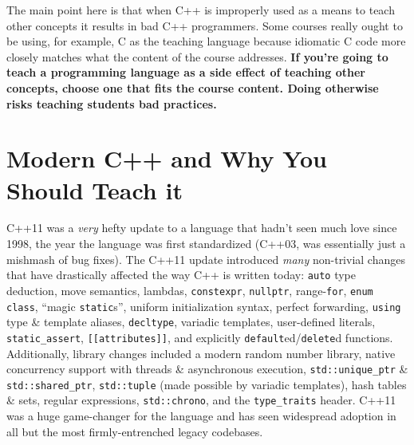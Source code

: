 \documentclass{article}
\begin{document}
 The main point here is that when C++ is improperly used as a means to teach other concepts it results in bad C++ programmers.  Some courses really ought to be using, for example, C as the teaching language because idiomatic C code more closely matches what the content of the course addresses.  \textbf{If you're going to teach a programming language as a side effect of teaching other concepts, choose one that fits the course content.  Doing otherwise risks teaching students bad practices.}

\section*{Modern C++ and Why You Should Teach it}
C++11 was a \emph{very} hefty update to a language that hadn't seen much love since 1998, the year the language was first standardized (C++03, was essentially just a mishmash of bug fixes).  The C++11 update introduced \emph{many} non-trivial changes that have drastically affected the way C++ is written today:  \texttt{auto} type deduction, move semantics, lambdas, \lstinline{constexpr}, \lstinline{nullptr}, range-\lstinline{for}, \lstinline{enum class}, ``magic \lstinline{static}s'', uniform initialization syntax, perfect forwarding, \lstinline{using} type \& template aliases, \lstinline{decltype}, variadic templates, user-defined literals, \lstinline{static_assert}, \lstinline{[[attributes]]}, and explicitly \lstinline{default}ed/\lstinline{delete}d functions.  Additionally, library changes included a modern random number library, native concurrency support with threads \& asynchronous execution, \lstinline{std::unique_ptr} \& \lstinline{std::shared_ptr}, \lstinline{std::tuple} (made possible by variadic templates), hash tables \& sets, regular expressions, \lstinline{std::chrono}, and the \lstinline{type_traits} header.  C++11 was a huge game-changer for the language and has seen widespread adoption in all but the most firmly-entrenched legacy codebases.
\end{document}
